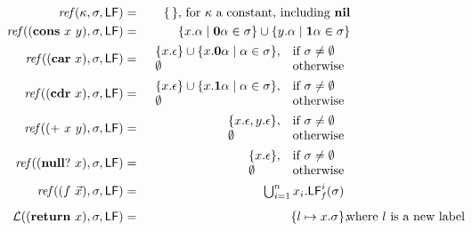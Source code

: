 \documentclass[10pt]{sigplanconf}
\def\myvec{\mathaccent"017E } %
\begin{document}
\begin{figure*}[t]  
\begin{eqnarray*}
\mathit{ref\/}(\kappa,\sigma,\Lfonly)
          &=& \{\,\} \mbox{, for $\kappa$ a constant, including $\NIL$}\\
\mathit{ref\/}((\CONS~x~y),\sigma,\Lfonly)
          &=& \{x.\alpha \mid \acar\alpha \in \sigma\} \cup \{y.\alpha \mid \acdr\alpha \in \sigma\} \\
\mathit{ref\/}((\CAR~x),\sigma,\Lfonly)
          &=&    \begin{array}{l l}
                    \{x.\epsilon\} \cup \{x.\acar\alpha \mid \alpha \in
\sigma\}, & \mbox{if}~\sigma \ne \emptyset\\
                    \emptyset  & \mbox{otherwise}
                 \end{array} \\
\mathit{ref\/}((\CDR~x),\sigma,\Lfonly)
          &=&    \begin{array}{l l}
                    \{x.\epsilon\} \cup \{x.\acdr\alpha \mid \alpha \in
\sigma\}, & \mbox{if}~\sigma \ne \emptyset\\
                    \emptyset  & \mbox{otherwise}
                 \end{array} \\
\mathit{ref\/}((\PRIM~x~y),\sigma,\Lfonly)
          &=&    \begin{array}{l l}
                    \{x.\epsilon, y.\epsilon\},  & \mbox{if}~\sigma \ne \emptyset\\
                    \emptyset  & \mbox{otherwise}
                 \end{array} \\
\mathit{ref\/}((\NULLQ~x),\sigma,\Lfonly)
          &=&    \begin{array}{l l}
                    \{x.\epsilon\},  & \mbox{if}~\sigma \ne \emptyset\\
                    \emptyset  & \mbox{otherwise}
                 \end{array} \\
\mathit{ref\/}((f~\myvec{x}),\sigma,\Lfonly)
          &=&  \begin{array}{@{}l}  %
               \bigcup_{i=1}^n x_i.\Lf{f}{i}{\sigma}
               \end{array}
\\[1ex]
\mathcal{L}((\RETURN~x),\sigma,\Lfonly) &=& \{l \mapsto x.\sigma\}, \makebox[0mm]{\hspace*{3cm} where $l$ is a new label} \\

\end{eqnarray*}
\end{figure*}
\end{document}
